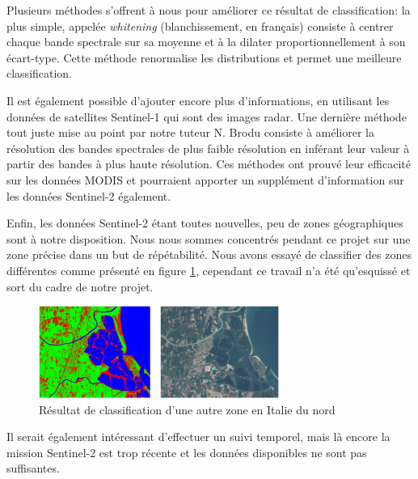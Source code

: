 \documentclass[a4paper,10pt]{report}
\begin{document}
Plusieurs méthodes s'offrent à nous pour améliorer ce résultat de classification: la plus simple, appelée \textit{whitening} (blanchissement, en français) consiste à centrer chaque bande spectrale sur sa moyenne et à la dilater proportionnellement à son écart-type. Cette méthode renormalise les distributions et permet une meilleure classification.

Il est également possible d'ajouter encore plus d'informations, en utilisant les données de satellites Sentinel-1 qui sont des images radar. Une dernière méthode tout juste mise au point par notre tuteur N. Brodu consiste à améliorer la résolution des bandes spectrales de plus faible résolution en inférant leur valeur à partir des bandes à plus haute résolution. Ces méthodes ont prouvé leur efficacité sur les données MODIS et pourraient apporter un supplément d'information sur les données Sentinel-2 également.

Enfin, les données Sentinel-2 étant toutes nouvelles, peu de zones géographiques sont à notre disposition. Nous nous sommes concentrés pendant ce projet sur une zone précise dans un but de répétabilité. Nous avons essayé de classifier des zones différentes comme présenté en figure \ref{fig:zone2}, cependant ce travail n'a été qu'esquissé et sort du cadre de notre projet.

\begin{figure}[H]
  \centering
    \includegraphics[width=0.7\textwidth]{zone2}
  \caption{Résultat de classification d'une autre zone en Italie du nord}
  \label{fig:zone2}
\end{figure}

Il serait également intéressant d'effectuer un suivi temporel, mais là encore la mission Sentinel-2 est trop récente et les données disponibles ne sont pas suffisantes. 




\end{document}
